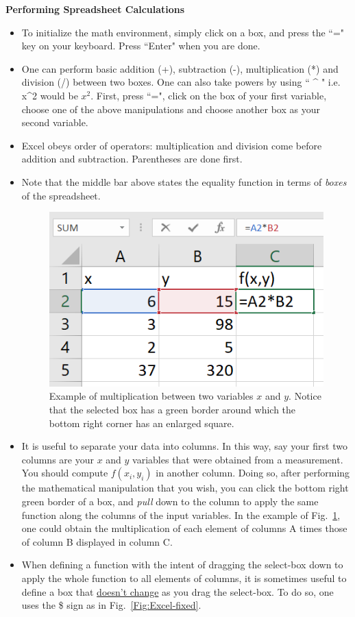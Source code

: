 \documentclass[12pt]{report}
\begin{document}
\begin{appendix}
\noindent \large \textbf{Performing Spreadsheet Calculations} \normalsize
\begin{itemize}
\item To initialize the math environment, simply click on a box, and press the ``=" key on your keyboard. Press ``Enter" when you are done.
\item One can perform basic addition (+), subtraction (-), multiplication (*) and division (/) between two boxes. One can also take powers by using `` ^ " i.e. x^2 would be $x^2$. First, press ``=", click on the box of your first variable, choose one of the above manipulations and choose another box as your second variable.
\item Excel obeys order of operators: multiplication and division come before addition and subtraction. Parentheses are done first.
\item Note that the middle bar above states the equality function in terms of \textit{boxes} of the spreadsheet.
\begin{figure}[h]
\centering
\includegraphics[width=0.4 \textwidth]{Excel-tut-boxes.png}
\caption{Example of multiplication between two variables $x$ and $y$. Notice that the selected box has a green border around which the bottom right corner has an enlarged square.}
\label{Fig:Excel-boxes}
\end{figure}
\item It is useful to separate your data into columns. In this way, say your first two columns are your $x$ and $y$ variables that were obtained from a measurement. You should compute $f(x_i, y_i)$ in another column. Doing so, after performing the mathematical manipulation that you wish, you can click the bottom right green border of a box, and \textit{pull} down to the column to apply the same function along the columns of the input variables. In the example of Fig.~\ref{Fig:Excel-boxes}, one could obtain the multiplication of each element of columns A times those of column B displayed in column C.
\item When defining a function with the intent of dragging the select-box down to apply the whole function to all elements of columns, it is sometimes useful to define a box that \underline{doesn't change} as you drag the select-box. To do so, one uses the \$ sign as in Fig.~\ref{Fig:Excel-fixed}.

\end{itemize}
\end{appendix}
\end{document}
